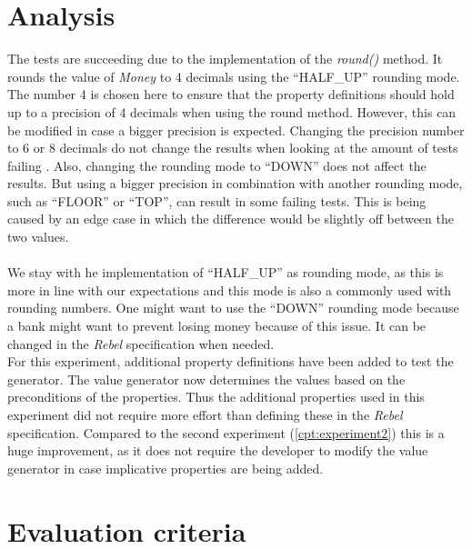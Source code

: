 \section{Analysis}
The tests are succeeding due to the implementation of the \textit{round()} method. It rounds the value of \textit{Money} to 4 decimals using the ``HALF\_UP'' rounding mode. The number 4 is chosen here to ensure that the property definitions should hold up to a precision of 4 decimals when using the round method. However, this can be modified in case a bigger precision is expected. Changing the precision number to 6 or 8 decimals do not change the results when looking at the amount of tests failing . Also, changing the rounding mode to ``DOWN'' does not affect the results. But using a bigger precision in combination with another rounding mode, such as ``FLOOR'' or ``TOP'', can result in some failing tests. This is being caused by an edge case in which the difference would be slightly off between the two values.\\
\\
We stay with he implementation of ``HALF\_UP'' as rounding mode, as this is more in line with our expectations and this mode is also a commonly used with rounding numbers. One might want to use the ``DOWN'' rounding mode because a bank might want to prevent losing money because of this issue. It can be changed in the \textit{Rebel} specification when needed.
\\
For this experiment, additional property definitions have been added to test the generator. The value generator now determines the values based on the preconditions of the properties. Thus the additional properties used in this experiment did not require more effort than defining these in the \textit{Rebel} specification. Compared to the second experiment (\autoref{cpt:experiment2}) this is a huge improvement, as it does not require the developer to modify the value generator in case implicative properties are being added.

\section{Evaluation criteria}

